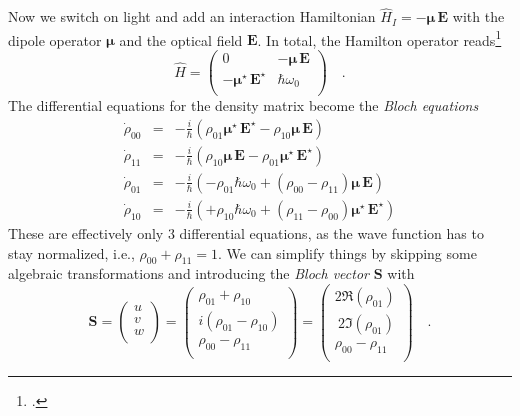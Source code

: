Now we switch on light and add an interaction Hamiltonian $\hat{H}_I = -\boldsymbol{\mu} \, \boldsymbol{E}$ with the  dipole operator $\boldsymbol{\mu} $ and the optical field   $\boldsymbol{E}$. In total, the Hamilton operator reads\footcite[chap. 3.8]{Rand2016}
\begin{equation}
 \hat{H } = \begin{pmatrix}
  0 & - {\boldsymbol{\mu}} \, \boldsymbol{E} \\ - {\boldsymbol{\mu}}^\star \, \boldsymbol{E}^\star & \hbar \omega_0 \\
 \end{pmatrix} \quad . \label{eq:rabi_bloch_hamiltonian}
\end{equation}
The differential equations for the density matrix become the \emph{Bloch equations}
\begin{eqnarray}
\dot{\rho}_{00} &=&  - \frac{i}{\hbar} \left( \rho_{01} \boldsymbol{\mu}^\star \, \boldsymbol{E}^\star - \rho_{10} \boldsymbol{\mu} \, \boldsymbol{E} \right) 
\label{eq:rabi_bloch_rho00}  \\
%
\dot{\rho}_{11} &=&  - \frac{i}{\hbar} \left( \rho_{10} \boldsymbol{\mu} \, \boldsymbol{E} - \rho_{01} \boldsymbol{\mu}^\star \, \boldsymbol{E}^\star \right) \\
%
\dot{\rho}_{01} &=& - \frac{i}{\hbar}  \left( - \rho_{01} \hbar \omega_0 + (\rho_{00} - \rho_{11})  \boldsymbol{\mu} \, \boldsymbol{E}\right) \\
%
\dot{\rho}_{10} &=& - \frac{i}{\hbar}  \left( + \rho_{10} \hbar \omega_0 + (\rho_{11} - \rho_{00})  \boldsymbol{\mu}^\star \, \boldsymbol{E}^\star \right) 
\label{eq:rabi_bloch_rho10}  %
\end{eqnarray}
These are effectively only 3 differential equations, as the wave function has to stay normalized, i.e., $\rho_{00} +\rho_{11} = 1$.
We can simplify things by skipping some algebraic transformations and introducing the \emph{Bloch vector} $\boldsymbol{S}$ with
\begin{equation}
\boldsymbol{S} = 
\begin{pmatrix}
u \\ v \\ w \\
\end{pmatrix}
= 
\begin{pmatrix}
\rho_{01} + \rho_{10} \\ i (\rho_{01} - \rho_{10}) \\ \rho_{00} - \rho_{11} \\
\end{pmatrix}
= 
\begin{pmatrix}
2 \Re (\rho_{01})  \\ \ 2 \Im (\rho_{01}) \\ \rho_{00} - \rho_{11} \\
\end{pmatrix} \quad .
\end{equation}

